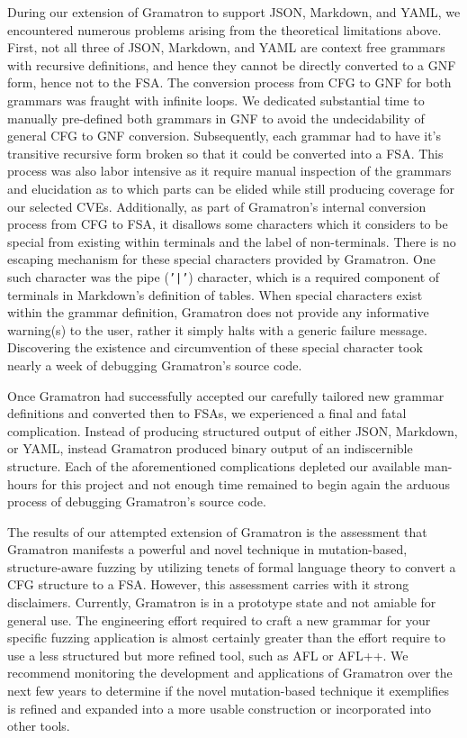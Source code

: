 \documentclass[12pt]{diazessay}
\begin{document}
During our extension of Gramatron to support JSON, Markdown, and YAML, we encountered numerous problems arising from the theoretical limitations above.
First, not all three of JSON, Markdown, and YAML are context free grammars with recursive definitions, and hence they cannot be directly converted to a GNF form, hence not to the FSA.
The conversion process from CFG to GNF for both grammars was fraught with infinite loops.
We dedicated substantial time to manually pre-defined both grammars in GNF to avoid the undecidability of general CFG to GNF conversion.
Subsequently, each grammar had to have it's transitive recursive form broken so that it could be converted into a FSA.
This process was also labor intensive as it require manual inspection of the grammars and elucidation as to which parts can be elided while still producing coverage for our selected CVEs.
Additionally, as part of Gramatron's internal conversion process from CFG to FSA, it disallows some characters which it considers to be special from existing within terminals and the label of non-terminals.
There is no escaping mechanism for these special characters provided by Gramatron.
One such character was the pipe (\texttt{'|'}) character, which is a required component of terminals in Markdown's definition of tables.
When special characters exist within the grammar definition, Gramatron does not provide any informative warning(s) to the user, rather it simply halts with a generic failure message.
Discovering the existence and circumvention of these special character took nearly a week of debugging Gramatron's source code.

Once Gramatron had successfully accepted our carefully tailored new grammar definitions and converted then to FSAs, we experienced a final and fatal complication.
Instead of producing structured output of either JSON, Markdown, or YAML, instead Gramatron produced binary output of an indiscernible structure.
Each of the aforementioned complications depleted our available man-hours for this project and not enough time remained to begin again the arduous process of debugging Gramatron's source code.

The results of our attempted extension of Gramatron is the assessment that Gramatron manifests a powerful and novel technique in mutation-based, structure-aware fuzzing by utilizing tenets of formal language theory to convert a CFG structure to a FSA.
However, this assessment carries with it strong disclaimers.
Currently, Gramatron is in a prototype state and not amiable for general use. 
The engineering effort required to craft a new grammar for your specific fuzzing application is almost certainly greater than the effort require to use a less structured but more refined tool, such as AFL or AFL++.
We recommend monitoring the development and applications of Gramatron over the next few years to determine if the novel mutation-based technique it exemplifies is refined and expanded into a more usable construction or incorporated into other tools.
\end{document}
